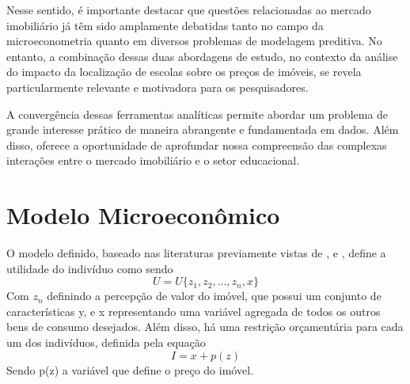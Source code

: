 Nesse sentido, é importante destacar que questões relacionadas ao mercado imobiliário já têm sido amplamente debatidas tanto no campo da microeconometria quanto em diversos problemas de modelagem preditiva. No entanto, a combinação dessas duas abordagens de estudo, no contexto da análise do impacto da localização de escolas sobre os preços de imóveis, se revela particularmente relevante e motivadora para os pesquisadores.

A convergência dessas ferramentas analíticas permite abordar um problema de grande interesse prático de maneira abrangente e fundamentada em dados. Além disso, oferece a oportunidade de aprofundar nossa compreensão das complexas interações entre o mercado imobiliário e o setor educacional.





\section{Modelo Microeconômico}

O modelo definido, baseado nas literaturas previamente vistas de \textcite{chan2020valuing}, \textcite{fack2010better} e \textcite{rosen1974hedonic} , define a utilidade do indivíduo como sendo
\begin{equation}
    U=U\{z_1,z_2,...,z_n,x\}
\end{equation}
Com \(z_n\) definindo a percepção de valor do imóvel, que possui um conjunto de características y, e x representando uma variável agregada de todos os outros bens de consumo desejados. Além disso, há uma restrição orçamentária para cada um dos indivíduos, definida pela equação
\begin{equation}
    I=x+p(z)
\end{equation}
Sendo p(z) a variável que define o preço do imóvel.


